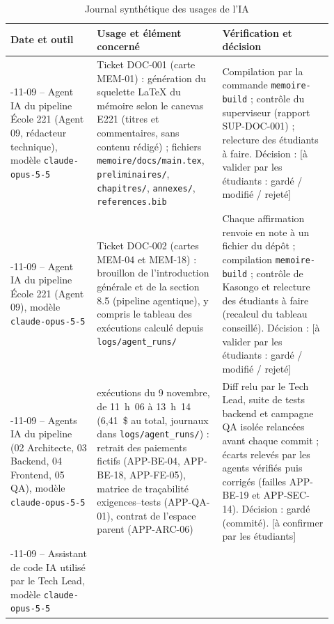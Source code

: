 \begin{table}[htbp]
  \centering
  \caption{Journal synthétique des usages de l'IA}
  \label{tab:journal-ia}
  \begin{tabular}{@{}>{\raggedright\arraybackslash}p{0.25\linewidth}>{\raggedright\arraybackslash}p{0.35\linewidth}>{\raggedright\arraybackslash}p{0.32\linewidth}@{}}
    \toprule
    \textbf{Date et outil} & \textbf{Usage et élément concerné} & \textbf{Vérification et décision} \\
    \midrule
    2026-11-09 -- Agent IA du pipeline École 221 (Agent 09, rédacteur technique), modèle \texttt{claude-opus-5-5} &
    Ticket DOC-001 (carte MEM-01) : génération du squelette LaTeX du mémoire selon le canevas E221 (titres et commentaires, sans contenu rédigé) ; fichiers \texttt{memoire/docs/main.tex}, \texttt{preliminaires/}, \texttt{chapitres/}, \texttt{annexes/}, \texttt{references.bib} &
    Compilation par la commande \texttt{memoire-build} ; contrôle du superviseur (rapport SUP-DOC-001) ; relecture des étudiants à faire. Décision : {[à valider par les étudiants : gardé / modifié / rejeté]} \\
    \midrule
    2026-11-09 -- Agent IA du pipeline École 221 (Agent 09), modèle \texttt{claude-opus-5-5} &
    Ticket DOC-002 (cartes MEM-04 et MEM-18) : brouillon de l'introduction générale et de la section 8.5 (pipeline agentique), y compris le tableau des exécutions calculé depuis \texttt{logs/agent\_runs/} &
    Chaque affirmation renvoie en note à un fichier du dépôt ; compilation \texttt{memoire-build} ; contrôle de Kasongo et relecture des étudiants à faire (recalcul du tableau conseillé). Décision : {[à valider par les étudiants : gardé / modifié / rejeté]} \\
    \midrule
    2026-11-09 -- Agents IA du pipeline (02 Architecte, 03 Backend, 04 Frontend, 05 QA), modèle \texttt{claude-opus-5-5} &
    7 exécutions du 9 novembre, de 11~h~06 à 13~h~14 (6,41~\$ au total, journaux dans \texttt{logs/agent\_runs/}) : retrait des paiements fictifs (APP-BE-04, APP-BE-18, APP-FE-05), matrice de traçabilité exigences--tests (APP-QA-01), contrat de l'espace parent (APP-ARC-06) &
    Diff relu par le Tech Lead, suite de tests backend et campagne QA isolée relancées avant chaque commit ; écarts relevés par les agents vérifiés puis corrigés (failles APP-BE-19 et APP-SEC-14). Décision : gardé (commité). {[à confirmer par les étudiants]} \\
    \midrule
    2026-11-09 -- Assistant de code IA utilisé par le Tech Lead, modèle \texttt{claude-opus-5-5} &

\end{tabular}
\end{table}
